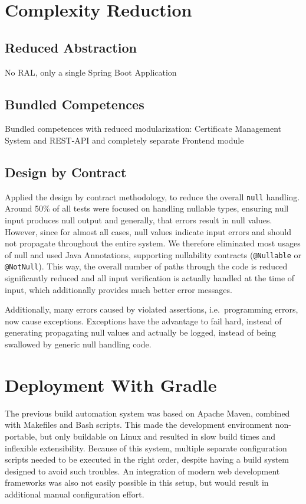 \section{Complexity Reduction}\label{sec:complexityReduction}
\subsection*{Reduced Abstraction}
No RAL, only a single Spring Boot Application

\subsection*{Bundled Competences}
Bundled competences with reduced modularization: Certificate Management System and REST-API and completely separate Frontend module

\subsection*{Design by Contract}
Applied the design by contract methodology, to reduce the overall \lstinline{null} handling.
Around 50\% of all tests were focused on handling nullable types, ensuring null input produces null output and
generally, that errors result in null values.
However, since for almost all cases, null values indicate input errors and should not propagate throughout the entire
system.
We therefore eliminated most usages of null and used Java Annotations, supporting nullability contracts
(\lstinline{@Nullable} or \lstinline{@NotNull}).
This way, the overall number of paths through the code is reduced significantly reduced and all input verification is
actually handled at the time of input, which additionally provides much better error messages.

Additionally, many errors caused by violated assertions, i.e.\ programming errors, now cause exceptions.
Exceptions have the advantage to fail hard, instead of generating propagating null values and actually be logged,
instead of being swallowed by generic null handling code.

\section{Deployment With Gradle}\label{sec:deploymentWithGradle}
The previous build automation system was based on Apache Maven, combined with Makefiles and Bash scripts.
This made the development environment non-portable, but only buildable on Linux and resulted in slow build times and
inflexible extensibility.
Because of this system, multiple separate configuration scripts needed to be executed in the right order, despite having
a build system designed to avoid such troubles.
An integration of modern web development frameworks was also not easily possible in this setup, but would result in
additional manual configuration effort.

